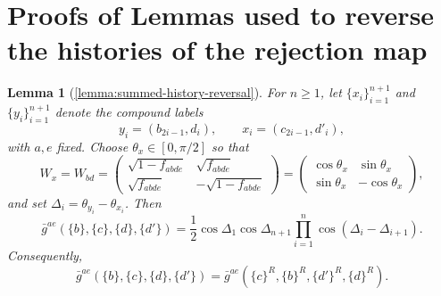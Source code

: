 \documentclass[aps,floatfix,10pt,amssymb,amsfont,amsmath,superscriptaddress,float,nofootinbib,longbibliography,nobalancelastpage,twocolumn]{revtex4-2}
\newtheorem*{lemma*}{Lemma}
\begin{document}
\section{Proofs of Lemmas used to reverse the histories of the rejection map}
\label{section:appendixHist}
\begin{lemma*}[\ref{lemma:summed-history-reversal}]
For $n\geq1$, let $\{x_i\}_{i=1}^{n+1}$ and $\{y_i\}_{i=1}^{n+1}$ denote
the compound labels
\begin{equation*}
    y_i=(b_{2i-1},d_i),\qquad x_i=(c_{2i-1},d'_i),
\end{equation*}
with $a,e$ fixed.  Choose $\theta_x\in[0,\pi/2]$ so that
\begin{equation*}
    W_x=W_{bd}=\begin{pmatrix}
                \sqrt{1 - f_{abde}} & \sqrt{f_{abde}}\\
       \sqrt{f_{abde}} & -\sqrt{1 - f_{abde}}
    \end{pmatrix}= \begin{pmatrix}\cos\theta_x&\sin\theta_x\\
    \sin\theta_x&-\cos\theta_x\end{pmatrix},
\end{equation*}
and set $\Delta_i=\theta_{y_i}-\theta_{x_i}$.  Then
\begin{equation}
    \bar g^{ae}(\{b\},\{c\},\{d\},\{d'\})
    =\frac12\cos\Delta_1\cos\Delta_{n+1}
      \prod_{i=1}^{n}\cos(\Delta_i-\Delta_{i+1}).
\end{equation}
Consequently,
\begin{equation}
    \bar g^{ae}(\{b\},\{c\},\{d\},\{d'\})
    =\bar g^{ae}(\{c\}^R,\{b\}^R,\{d'\}^R,\{d\}^R).
    \label{eq:PRR}
\end{equation}
\end{lemma*}
\end{document}
